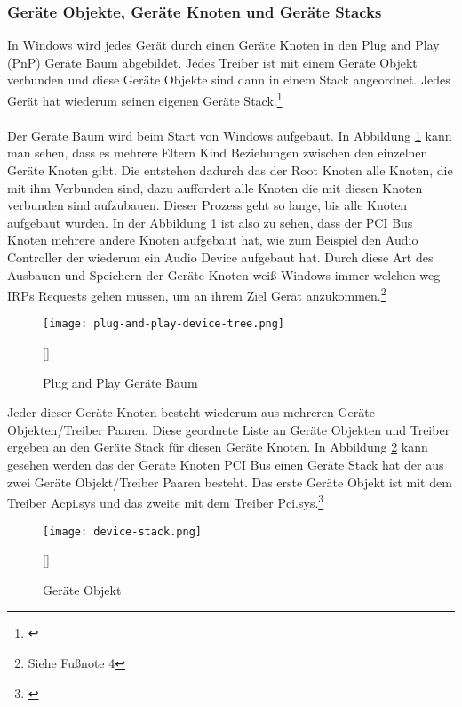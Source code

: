 \subsubsection{Geräte Objekte, Geräte Knoten und Geräte Stacks}
In Windows wird jedes Gerät durch einen Geräte Knoten in den Plug and Play (PnP) Geräte Baum abgebildet. Jedes Treiber ist mit einem Geräte Objekt verbunden und diese Geräte Objekte sind dann in einem Stack angeordnet. Jedes Gerät hat wiederum seinen eigenen Geräte Stack.\footnote[4]{\cite[Vgl.][]{24}}
\\\\
Der Geräte Baum wird beim Start von Windows aufgebaut. In Abbildung \ref{windows-plug-and-play-tree} kann man sehen, dass es mehrere Eltern Kind Beziehungen zwischen den einzelnen Geräte Knoten gibt. Die entstehen dadurch das der Root Knoten alle Knoten, die mit ihm Verbunden sind, dazu auffordert alle Knoten die mit diesen Knoten verbunden sind aufzubauen. Dieser Prozess geht so lange, bis alle Knoten aufgebaut wurden. In der Abbildung \ref{windows-plug-and-play-tree} ist also zu sehen, dass der PCI Bus Knoten mehrere andere Knoten aufgebaut hat, wie zum Beispiel den Audio Controller der wiederum ein Audio Device aufgebaut hat. Durch diese Art des Ausbauen und Speichern der Geräte Knoten weiß Windows immer welchen weg IRPs Requests gehen müssen, um an ihrem Ziel Gerät anzukommen.\footnote[5]{Siehe Fußnote 4}
\newpage
\begin{figure}[H]
    \centering
    \texttt{[image: plug-and-play-device-tree.png]}
    \caption[Plug and Play Geräte Baum]{Plug and Play Geräte Baum}[\cite{24}]
    \label{windows-plug-and-play-tree} 
\end{figure}
\noindent
Jeder dieser Geräte Knoten besteht wiederum aus mehreren Geräte Objekten/Treiber Paaren. Diese geordnete Liste an Geräte Objekten und Treiber ergeben an den Geräte Stack für diesen Geräte Knoten. In Abbildung \ref{windows-device-object} kann gesehen werden das der Geräte Knoten PCI Bus einen Geräte Stack hat der aus zwei Geräte Objekt/Treiber Paaren besteht. Das erste Geräte Objekt ist mit dem Treiber Acpi.sys und das zweite mit dem Treiber Pci.sys.\footnote[1]{\cite[Vgl.][]{24}}
\begin{figure}[H]
    \centering
    \texttt{[image: device-stack.png]}
    \caption[Geräte Objekt]{Geräte Objekt}[\cite{24}]
    \label{windows-device-object}
\end{figure}
\noindent

\newpage

